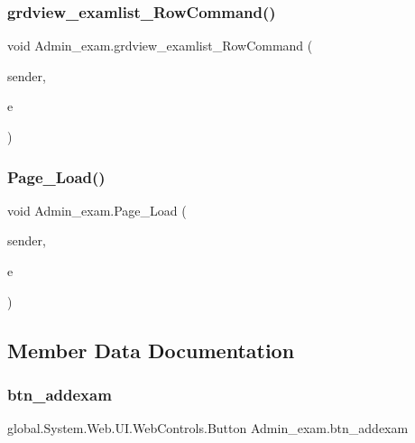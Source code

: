 \mbox{\label{class_admin__exam_aff3ef80a19bde9a35217da0953e2ccba}} 
\subsubsection{\texorpdfstring{grdview\_examlist\_RowCommand()}{grdview\_examlist\_RowCommand()}}
{\footnotesize\ttfamily void Admin\+\_\+exam.\+grdview\+\_\+examlist\+\_\+\+Row\+Command (\begin{DoxyParamCaption}\item[{object}]{sender,  }\item[{Grid\+View\+Command\+Event\+Args}]{e }\end{DoxyParamCaption})\hspace{0.3cm}{\ttfamily [protected]}}

\mbox{\label{class_admin__exam_a00a00feaddf0698b9b7e6b18ff9424a9}} 
\subsubsection{\texorpdfstring{Page\_Load()}{Page\_Load()}}
{\footnotesize\ttfamily void Admin\+\_\+exam.\+Page\+\_\+\+Load (\begin{DoxyParamCaption}\item[{object}]{sender,  }\item[{Event\+Args}]{e }\end{DoxyParamCaption})\hspace{0.3cm}{\ttfamily [protected]}}



\subsection{Member Data Documentation}
\mbox{\label{class_admin__exam_a4f41d32477ff661b1621a64115a475f6}} 
\subsubsection{\texorpdfstring{btn\_addexam}{btn\_addexam}}
{\footnotesize\ttfamily global.\+System.\+Web.\+U\+I.\+Web\+Controls.\+Button Admin\+\_\+exam.\+btn\+\_\+addexam\hspace{0.3cm}{\ttfamily [protected]}}



